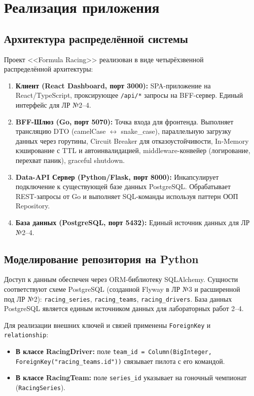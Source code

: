 \documentclass[oneside,a4paper,14pt]{extarticle}
\begin{document}
\clearpage
\section*{Реализация приложения}

\subsection*{Архитектура распределённой системы}
Проект <<Formula Racing>> реализован в виде четырёхзвенной распределённой архитектуры:
\begin{enumerate}
    \item \textbf{Клиент (React Dashboard, порт 3000):} SPA-приложение на React/TypeScript, проксирующее \texttt{/api/*} запросы на BFF-сервер. Единый интерфейс для ЛР №2--4.
    \item \textbf{BFF-Шлюз (Go, порт 5070):} Точка входа для фронтенда. Выполняет трансляцию DTO (camelCase $\leftrightarrow$ snake\_case), параллельную загрузку данных через горутины, Circuit Breaker для отказоустойчивости, In-Memory кэширование с TTL и автоинвалидацией, middleware-конвейер (логирование, перехват паник), graceful shutdown.
    \item \textbf{Data-API Сервер (Python/Flask, порт 8000):} Инкапсулирует подключение к существующей базе данных PostgreSQL. Обрабатывает REST-запросы от Go и выполняет SQL-команды используя паттерн ООП Repository.
    \item \textbf{База данных (PostgreSQL, порт 5432):} Единый источник данных для ЛР №2--4.
\end{enumerate}

\subsection*{Моделирование репозитория на Python}
Доступ к данным обеспечен через ORM-библиотеку SQLAlchemy. Сущности соответствуют схеме PostgreSQL (созданной Flyway в ЛР №3 и расширенной под ЛР №2): \texttt{racing\_series}, \texttt{racing\_teams}, \texttt{racing\_drivers}. База данных PostgreSQL является единым источником данных для лабораторных работ 2–4.

Для реализации внешних ключей и связей применены \texttt{ForeignKey} и \texttt{relationship}:
\begin{itemize}
  \item \textbf{В классе RacingDriver:} поле \texttt{team\_id = Column(BigInteger, ForeignKey("racing\_teams.id"))} связывает пилота с его командой.
  \item \textbf{В классе RacingTeam:} поле \texttt{series\_id} указывает на гоночный чемпионат (\texttt{RacingSeries}).
\end{itemize}
\end{document}
